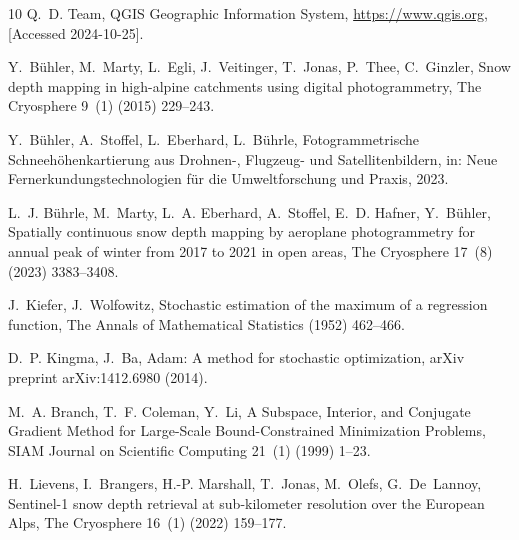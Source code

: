 \documentclass[preprint,12pt]{elsarticle}
\begin{document}
\begin{thebibliography}{10}
Q.~D. Team, {QGIS Geographic Information System}, \url{https://www.qgis.org}, [Accessed 2024-10-25].

Y.~B\"uhler, M.~Marty, L.~Egli, J.~Veitinger, T.~Jonas, P.~Thee, C.~Ginzler, Snow depth mapping in high-alpine catchments using digital photogrammetry, The Cryosphere 9~(1) (2015) 229–243.

Y.~B\"{u}hler, A.~Stoffel, L.~Eberhard, L.~B\"{u}hrle, {Fotogrammetrische Schneeh\"{o}henkartierung aus Drohnen-, Flugzeug- und Satellitenbildern}, in: Neue Fernerkundungstechnologien f\"{u}r die Umweltforschung und Praxis, 2023.

L.~J. B{\"u}hrle, M.~Marty, L.~A. Eberhard, A.~Stoffel, E.~D. Hafner, Y.~B{\"u}hler, Spatially continuous snow depth mapping by aeroplane photogrammetry for annual peak of winter from 2017 to 2021 in open areas, The Cryosphere 17~(8) (2023) 3383--3408.

J.~Kiefer, J.~Wolfowitz, Stochastic estimation of the maximum of a regression function, The Annals of Mathematical Statistics (1952) 462--466.

D.~P. Kingma, J.~Ba, {Adam: A method for stochastic optimization}, arXiv preprint arXiv:1412.6980 (2014).

M.~A. Branch, T.~F. Coleman, Y.~Li, {A Subspace, Interior, and Conjugate Gradient Method for Large-Scale Bound-Constrained Minimization Problems}, SIAM Journal on Scientific Computing 21~(1) (1999) 1--23.

H.~Lievens, I.~Brangers, H.-P. Marshall, T.~Jonas, M.~Olefs, G.~De~Lannoy, {Sentinel-1 snow depth retrieval at sub-kilometer resolution over the European Alps}, The Cryosphere 16~(1) (2022) 159--177.

\end{thebibliography}
\end{document}
